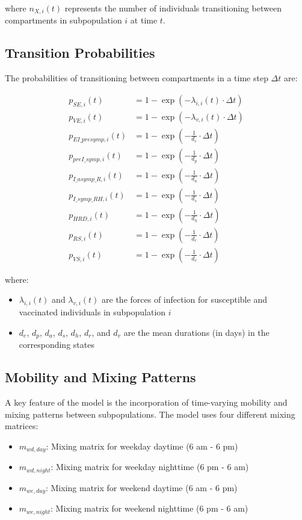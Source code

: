 \documentclass{article}
\begin{document}
where $n_{X,i}(t)$ represents the number of individuals transitioning between compartments in subpopulation $i$ at time $t$.

\subsection{Transition Probabilities}

The probabilities of transitioning between compartments in a time step $\Delta t$ are:

\begin{align}
p_{SE,i}(t) &= 1 - \exp(-\lambda_{i,i}(t) \cdot \Delta t) \\
p_{VE,i}(t) &= 1 - \exp(-\lambda_{v,i}(t) \cdot \Delta t) \\
p_{EI\_presymp,i}(t) &= 1 - \exp(-\frac{1}{d_e} \cdot \Delta t) \\
p_{preI\_symp,i}(t) &= 1 - \exp(-\frac{1}{d_p} \cdot \Delta t) \\
p_{I\_asymp\_R,i}(t) &= 1 - \exp(-\frac{1}{d_a} \cdot \Delta t) \\
p_{I\_symp\_RH,i}(t) &= 1 - \exp(-\frac{1}{d_s} \cdot \Delta t) \\
p_{HRD,i}(t) &= 1 - \exp(-\frac{1}{d_h} \cdot \Delta t) \\
p_{RS,i}(t) &= 1 - \exp(-\frac{1}{d_r} \cdot \Delta t) \\
p_{VS,i}(t) &= 1 - \exp(-\frac{1}{d_v} \cdot \Delta t)
\end{align}

where:
\begin{itemize}
    \item $\lambda_{i,i}(t)$ and $\lambda_{v,i}(t)$ are the forces of infection for susceptible and vaccinated individuals in subpopulation $i$
    \item $d_e$, $d_p$, $d_a$, $d_s$, $d_h$, $d_r$, and $d_v$ are the mean durations (in days) in the corresponding states
\end{itemize}

\subsection{Mobility and Mixing Patterns}

A key feature of the model is the incorporation of time-varying mobility and mixing patterns between subpopulations. The model uses four different mixing matrices:

\begin{itemize}
    \item $m_{wd,day}$: Mixing matrix for weekday daytime (6 am - 6 pm)
    \item $m_{wd,night}$: Mixing matrix for weekday nighttime (6 pm - 6 am)
    \item $m_{we,day}$: Mixing matrix for weekend daytime (6 am - 6 pm)
    \item $m_{we,night}$: Mixing matrix for weekend nighttime (6 pm - 6 am)
\end{itemize}
\end{document}
